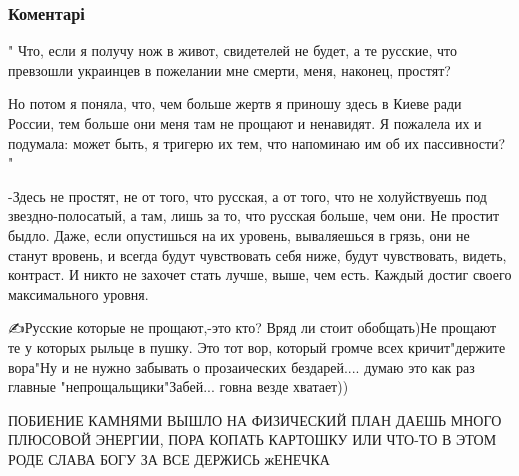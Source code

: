  
 
 
 
 
\subsubsection{Коментарі}

\begin{itemize} %

" Что, если я получу нож в живот, свидетелей не будет, а те русские, что
превзошли украинцев в пожелании мне смерти, меня, наконец, простят?

Но потом я поняла, что, чем больше жертв я приношу здесь в Киеве ради России,
тем больше они меня там не прощают и ненавидят. Я пожалела их и подумала: может
быть, я тригерю их тем, что напоминаю им об их пассивности? "

-Здесь не простят, не от того, что русская, а от того, что не холуйствуешь под
звездно-полосатый, а там, лишь за то, что русская больше, чем они. Не простит
быдло. Даже, если опустишься на их уровень, вываляешься в грязь, они не станут
вровень, и всегда будут чувствовать себя ниже, будут чувствовать, видеть,
контраст. И никто не захочет стать лучше, выше, чем есть. Каждый достиг своего
максимального уровня.


✍Русские которые не прощают,-это кто? Вряд ли стоит обобщать)Не прощают те у
которых рыльце в пушку. Это тот вор, который громче всех кричит"держите вора"Ну и
не нужно забывать о прозаических бездарей.... думаю это как раз главные
"непрощальщики"Забей... говна везде хватает))



ПОБИЕНИЕ КАМНЯМИ ВЫШЛО НА ФИЗИЧЕСКИЙ ПЛАН ДАЕШЬ МНОГО ПЛЮСОВОЙ ЭНЕРГИИ, ПОРА
КОПАТЬ КАРТОШКУ ИЛИ ЧТО-ТО В ЭТОМ РОДЕ СЛАВА БОГУ ЗА ВСЕ ДЕРЖИСЬ жЕНЕЧКА

\end{itemize} %

